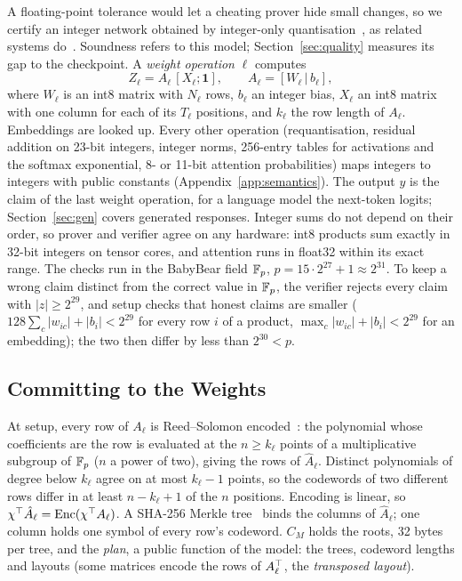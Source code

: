 A floating-point tolerance would let a cheating prover hide small changes, so we certify an integer
network obtained by integer-only quantisation~\cite{jacob2018quant}, as related systems
do~\cite{safetynets,slalom,zkcnn,zkml,zkllm}.
Soundness refers to this model; Section~\ref{sec:quality} measures its gap to the checkpoint. A
\emph{weight operation} $\ell$ computes
\begin{equation}
  Z_\ell = A_\ell\,[X_\ell;\mathbf 1], \qquad A_\ell=[W_\ell\,|\,b_\ell],
  \label{eq:weightop}
\end{equation}
where $W_\ell$ is an int8 matrix with $N_\ell$ rows, $b_\ell$ an integer bias, $X_\ell$ an int8
matrix with one column for each of its $T_\ell$ positions, and $k_\ell$ the row length of $A_\ell$.
Embeddings are looked up. Every other operation (requantisation, residual addition on 23-bit
integers, integer norms, 256-entry tables for activations and the softmax exponential, 8- or
11-bit attention probabilities) maps integers to integers with public constants
(Appendix~\ref{app:semantics}). The output $y$ is the claim of the last weight operation, for a
language model the next-token logits; Section~\ref{sec:gen} covers generated responses. Integer sums
do not depend on their order, so prover and verifier agree on any hardware: int8 products sum
exactly in 32-bit integers on tensor cores, and attention runs in float32 within its exact range.
The checks run in the BabyBear field $\mathbb{F}_p$, $p=15\cdot2^{27}+1\approx2^{31}$. To keep a wrong claim
distinct from the correct value in $\mathbb{F}_p$, the verifier rejects every claim with $|z|\ge2^{29}$, and
setup checks that honest claims are smaller ($128\sum_c|w_{ic}|+|b_i|<2^{29}$ for every row $i$ of
a product, $\max_c|w_{ic}|+|b_i|<2^{29}$ for an embedding); the two then differ by less than
$2^{30}<p$.

\subsection{Committing to the Weights}
\label{sec:commit}

At setup, every row of $A_\ell$ is Reed--Solomon encoded~\cite{reedsolomon1960}: the polynomial
whose coefficients are the row is evaluated at the $n\ge k_\ell$ points of a multiplicative subgroup
of $\mathbb{F}_p$ ($n$ a power of two), giving the rows of $\hat A_\ell$. Distinct polynomials of degree
below $k_\ell$ agree on at most $k_\ell-1$ points, so the codewords of two different rows differ
in at least $n-k_\ell+1$ of the $n$ positions. Encoding is linear, so $\chi^\top\hat A_\ell=\mathrm{Enc}(\chi^\top
A_\ell)$. A SHA-256 Merkle tree~\cite{merkle1987} binds the columns of $\hat A_\ell$; one column
holds one symbol of every row's codeword. $C_M$ holds the roots, 32 bytes per tree, and the
\emph{plan}, a public function of the model: the trees, codeword lengths and layouts (some matrices
encode the rows of $A_\ell^\top$, the \emph{transposed layout}).


